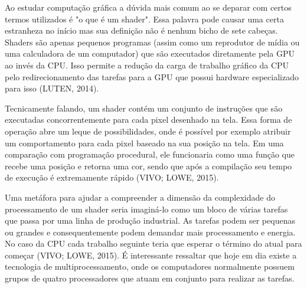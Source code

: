 
Ao estudar computação gráfica a dúvida mais comum ao se deparar com certos termos utilizados é "o que é um shader". Essa palavra pode causar uma certa estranheza no início mas sua definição não é nenhum bicho de sete cabeças. Shaders são apenas pequenos programas (assim como um reprodutor de mídia ou uma calculadora de um computador) que são executados diretamente pela \acrshort{GPU} ao invés da \acrshort{CPU}. Isso permite a redução da carga de trabalho gráfico da \acrshort{CPU} pelo redirecionamento das tarefas para a \acrshort{GPU} que possui hardware especializado para isso (LUTEN, 2014)\nocite{openGLBook}.

	\begin{figure}[h!]
		\centering
	\end{figure}
	\nocite{figura5}

Tecnicamente falando, um shader contém um conjunto de instruções que são executadas concorrentemente para cada pixel desenhado na tela. Essa forma de operação abre um leque de possibilidades, onde é possível por exemplo atribuir um comportamento para cada pixel baseado na sua posição na tela. Em uma comparação com programação procedural, ele funcionaria como uma função que recebe uma posição e retorna uma cor, sendo que após a compilação seu tempo de execução é extremamente rápido (VIVO; LOWE, 2015)\nocite{bookOfShaders}.

Uma metáfora para ajudar a compreender a dimensão da complexidade do processamento de um shader seria imaginá-lo como um bloco de várias tarefas que passa por uma linha de produção industrial. As tarefas podem ser pequenas ou grandes e consequentemente podem demandar mais processamento e energia. No caso da CPU cada trabalho seguinte teria que esperar o término do atual para começar (VIVO; LOWE, 2015)\nocite{bookOfShaders}. É interessante ressaltar que hoje em dia existe a tecnologia de multiprocessamento, onde os computadores normalmente possuem grupos de quatro processadores que atuam em conjunto para realizar as tarefas.

